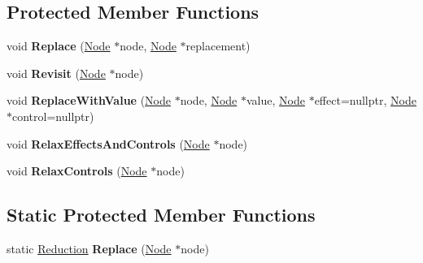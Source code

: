 \subsection*{Protected Member Functions}
\begin{DoxyCompactItemize}
\item 
\mbox{\label{classv8_1_1internal_1_1compiler_1_1AdvancedReducer_a375f732a84655a28f171351dc76f8acc}} 
void {\bfseries Replace} (\mbox{\hyperlink{classv8_1_1internal_1_1compiler_1_1Node}{Node}} $\ast$node, \mbox{\hyperlink{classv8_1_1internal_1_1compiler_1_1Node}{Node}} $\ast$replacement)
\item 
\mbox{\label{classv8_1_1internal_1_1compiler_1_1AdvancedReducer_a64cae7699553789a4534c549c9170816}} 
void {\bfseries Revisit} (\mbox{\hyperlink{classv8_1_1internal_1_1compiler_1_1Node}{Node}} $\ast$node)
\item 
\mbox{\label{classv8_1_1internal_1_1compiler_1_1AdvancedReducer_a2573497dc120509db4c00a28d8d3a9cb}} 
void {\bfseries Replace\+With\+Value} (\mbox{\hyperlink{classv8_1_1internal_1_1compiler_1_1Node}{Node}} $\ast$node, \mbox{\hyperlink{classv8_1_1internal_1_1compiler_1_1Node}{Node}} $\ast$value, \mbox{\hyperlink{classv8_1_1internal_1_1compiler_1_1Node}{Node}} $\ast$effect=nullptr, \mbox{\hyperlink{classv8_1_1internal_1_1compiler_1_1Node}{Node}} $\ast$control=nullptr)
\item 
\mbox{\label{classv8_1_1internal_1_1compiler_1_1AdvancedReducer_a2f1059b277571c651117544bd023cb8c}} 
void {\bfseries Relax\+Effects\+And\+Controls} (\mbox{\hyperlink{classv8_1_1internal_1_1compiler_1_1Node}{Node}} $\ast$node)
\item 
\mbox{\label{classv8_1_1internal_1_1compiler_1_1AdvancedReducer_a69dd3891050d9e54a9b82db9bd55eacc}} 
void {\bfseries Relax\+Controls} (\mbox{\hyperlink{classv8_1_1internal_1_1compiler_1_1Node}{Node}} $\ast$node)
\end{DoxyCompactItemize}
\subsection*{Static Protected Member Functions}
\begin{DoxyCompactItemize}
\item 
\mbox{\label{classv8_1_1internal_1_1compiler_1_1AdvancedReducer_a6b9e69978e8440e00ca157d8e4fef297}} 
static \mbox{\hyperlink{classv8_1_1internal_1_1compiler_1_1Reduction}{Reduction}} {\bfseries Replace} (\mbox{\hyperlink{classv8_1_1internal_1_1compiler_1_1Node}{Node}} $\ast$node)
\end{DoxyCompactItemize}
